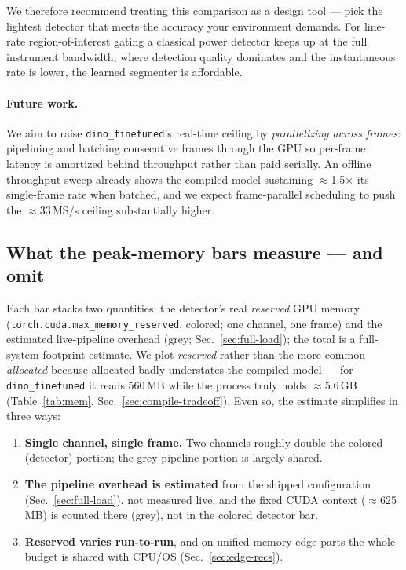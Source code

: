 We therefore recommend treating this comparison as a design tool --- pick the lightest detector that
meets the accuracy your environment demands. For line-rate region-of-interest gating a classical
power detector keeps up at the full instrument bandwidth; where detection quality dominates and the
instantaneous rate is lower, the learned segmenter is affordable.

\paragraph{Future work.} We aim to raise \texttt{dino\_finetuned}'s real-time ceiling by
\emph{parallelizing across frames}: pipelining and batching consecutive frames through the GPU so
per-frame latency is amortized behind throughput rather than paid serially. An offline throughput
sweep already shows the compiled model sustaining $\approx$1.5$\times$ its single-frame rate when
batched, and we expect frame-parallel scheduling to push the $\approx$33\,MS/s ceiling substantially
higher.

\subsection{What the peak-memory bars measure --- and omit}
\label{sec:mem-accounting}

Each bar stacks two quantities: the detector's real \emph{reserved} GPU memory
(\texttt{torch.cuda.max\_memory\_reserved}, colored; one channel, one frame) and the estimated
live-pipeline overhead (grey; Sec.~\ref{sec:full-load}); the total is a full-system footprint
estimate. We plot \emph{reserved} rather than the more common \emph{allocated} because allocated
badly understates the compiled model --- for \texttt{dino\_finetuned} it reads 560\,MB while the
process truly holds $\approx$5.6\,GB (Table~\ref{tab:mem}, Sec.~\ref{sec:compile-tradeoff}). Even
so, the estimate simplifies in three ways:

\begin{enumerate}
  \item \textbf{Single channel, single frame.} Two channels roughly double the colored (detector)
        portion; the grey pipeline portion is largely shared.
  \item \textbf{The pipeline overhead is estimated} from the shipped configuration
        (Sec.~\ref{sec:full-load}), not measured live, and the fixed CUDA context
        ($\approx$625\,MB) is counted there (grey), not in the colored detector bar.
  \item \textbf{Reserved varies run-to-run}, and on unified-memory edge parts the whole budget is
        shared with CPU/OS (Sec.~\ref{sec:edge-recs}).
\end{enumerate}


